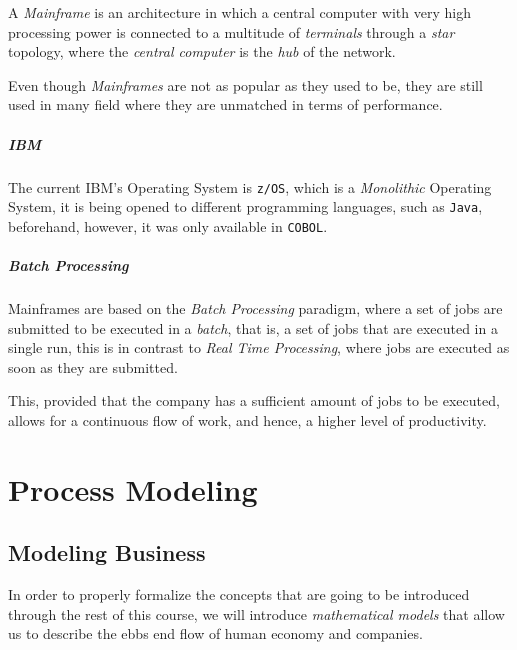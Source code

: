 \documentclass[openright, twoside, twocolumn]{report}
\begin{document}
    \begin{definition}
      \label{def:mainf}
      A \emph{Mainframe} is an architecture in which a central computer with very high
      processing power is connected to a multitude of \emph{terminals} through a
      \emph{star} topology, where the \emph{central computer} is the \emph{hub} of the
      network.
    \end{definition}

    Even though \emph{Mainframes} are not as popular as they used to be, they are still used in many
    field where they are unmatched in terms of performance.

    \paragraph{IBM}

    The current IBM's Operating System is \texttt{z/OS}, which is a \emph{Monolithic} Operating System,
    it is being opened to different programming languages, such as \texttt{Java}, beforehand, however,
    it was only available in \texttt{COBOL}.

    \paragraph{Batch Processing}

    Mainframes are based on the \emph{Batch Processing} paradigm, where a set of jobs are submitted to
    be executed in a \emph{batch}, that is, a set of jobs that are executed in a single run, this is
    in contrast to \emph{Real Time Processing}, where jobs are executed as soon as they are submitted.

    This, provided that the company has a sufficient amount of jobs to be executed, allows for a continuous
    flow of work, and hence, a higher level of productivity.

    \chapter{Process Modeling}

    \section{Modeling Business}

    In order to properly formalize the concepts that are going to be introduced through the rest
    of this course, we will introduce \emph{mathematical models} that allow us to describe the
    ebbs end flow of human economy and companies.
\end{document}
